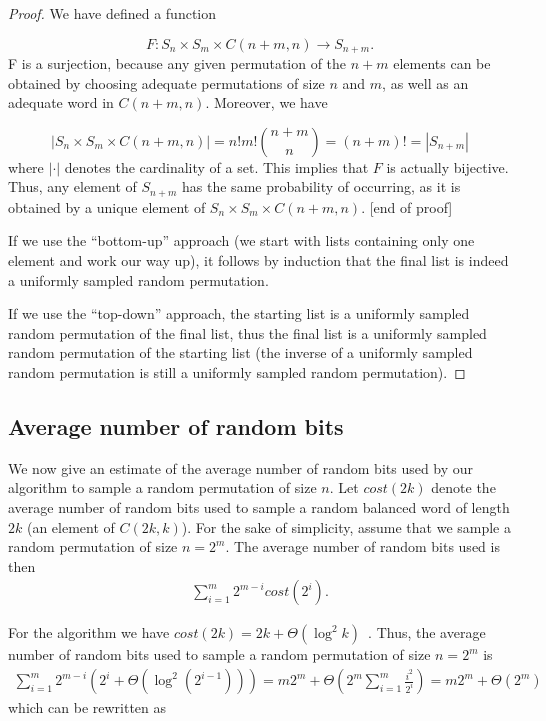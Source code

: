 \documentclass[letter,11pt,en]{quick-document}
\begin{document}
\begin{proof}
  We have defined a function

\begin{equation}
F : S_n \times S_m \times C(n+m,n) \rightarrow S_{n+m}.
\end{equation}
F is a surjection, because any given permutation of the $n+m$ elements can
be obtained by choosing adequate permutations of size $n$ and $m$, as well
as an adequate word in $C(n+m,n)$. Moreover, we have

\begin{equation}
\left|S_n \times S_m \times C(n+m,n)\right| = n! m! \binom{n+m}{n} = (n+m)! = |S_{n+m}|
\end{equation}
where $|\cdot|$ denotes the cardinality of a set. This implies that $F$ is
actually bijective. Thus, any element of $S_{n+m}$ has the same
probability of occurring, as it is obtained by a unique element of
$S_n \times S_m \times C(n+m,n)$. [end of proof]

If we use the ``bottom-up'' approach (we start with lists containing only
one element and work our way up), it follows by induction that the final
list is indeed a uniformly sampled random permutation.

If we use the ``top-down'' approach, the starting list is a uniformly
sampled random permutation of the final list, thus the final list is a
uniformly sampled random permutation of the starting list (the inverse of
a uniformly sampled random permutation is still a uniformly sampled random
permutation).
\end{proof}

\subsection{Average number of random bits}

We now give an estimate of the average number of random bits used by our
algorithm to sample a random permutation of size $n$. Let $cost(2k)$
denote the average number of random bits used to sample a random balanced
word of length $2k$ (an element of $C(2k,k)$). For the sake of simplicity,
assume that we sample a random permutation of size $n = 2^m$. The average
number of random bits used is then
\begin{align*}\label{bitcomplexity}
\sum_{i=1}^m 2^{m-i} cost(2^i).
\end{align*}

For the algorithm we have
$cost(2k) = 2k + \Theta (\log^2 k)$~\cite{BaBoJa14}. Thus, the average
number of random bits used to sample a random permutation of size
$n = 2^m$ is
\begin{align*}
\sum_{i=1}^m 2^{m-i} \left(2^i + \Theta\left(\log^2 (2^{i-1})\right)\right) = m 2^m + \Theta \left(2^m \sum_{i=1}^m \frac{i^2}{2^i}\right) = m 2^m + \Theta (2^m)
\end{align*}
which can be rewritten as
\end{document}
